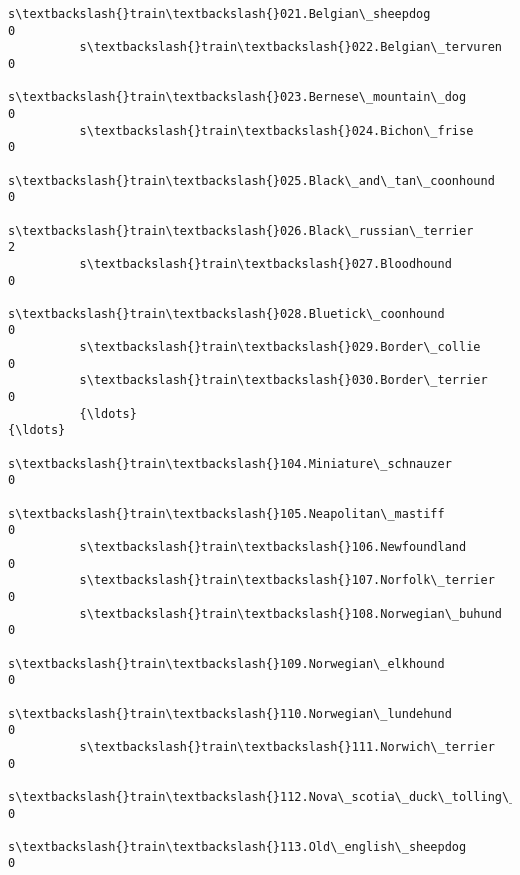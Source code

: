 \documentclass[11pt]{article}
\begin{document}
\begin{Verbatim}[commandchars=\\\{\}]
          s\textbackslash{}train\textbackslash{}021.Belgian\_sheepdog                                                   0   
          s\textbackslash{}train\textbackslash{}022.Belgian\_tervuren                                                   0   
          s\textbackslash{}train\textbackslash{}023.Bernese\_mountain\_dog                                               0   
          s\textbackslash{}train\textbackslash{}024.Bichon\_frise                                                       0   
          s\textbackslash{}train\textbackslash{}025.Black\_and\_tan\_coonhound                                            0   
          s\textbackslash{}train\textbackslash{}026.Black\_russian\_terrier                                              2   
          s\textbackslash{}train\textbackslash{}027.Bloodhound                                                         0   
          s\textbackslash{}train\textbackslash{}028.Bluetick\_coonhound                                                 0   
          s\textbackslash{}train\textbackslash{}029.Border\_collie                                                      0   
          s\textbackslash{}train\textbackslash{}030.Border\_terrier                                                     0   
          {\ldots}                                                                          {\ldots}   
          s\textbackslash{}train\textbackslash{}104.Miniature\_schnauzer                                                0   
          s\textbackslash{}train\textbackslash{}105.Neapolitan\_mastiff                                                 0   
          s\textbackslash{}train\textbackslash{}106.Newfoundland                                                       0   
          s\textbackslash{}train\textbackslash{}107.Norfolk\_terrier                                                    0   
          s\textbackslash{}train\textbackslash{}108.Norwegian\_buhund                                                   0   
          s\textbackslash{}train\textbackslash{}109.Norwegian\_elkhound                                                 0   
          s\textbackslash{}train\textbackslash{}110.Norwegian\_lundehund                                                0   
          s\textbackslash{}train\textbackslash{}111.Norwich\_terrier                                                    0   
          s\textbackslash{}train\textbackslash{}112.Nova\_scotia\_duck\_tolling\_retriever                                 0   
          s\textbackslash{}train\textbackslash{}113.Old\_english\_sheepdog                                               0   

\end{Verbatim}
\end{document}
